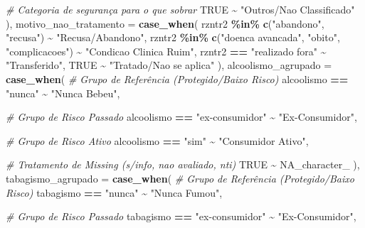 \documentclass[
]{article}
\newenvironment{Shaded}{\begin{snugshade}}{\end{snugshade}}
\newcommand{\AttributeTok}[1]{\textcolor[rgb]{0.13,0.29,0.53}{#1}}
\newcommand{\CommentTok}[1]{\textcolor[rgb]{0.56,0.35,0.01}{\textit{#1}}}
\newcommand{\ConstantTok}[1]{\textcolor[rgb]{0.56,0.35,0.01}{#1}}
\newcommand{\FunctionTok}[1]{\textcolor[rgb]{0.13,0.29,0.53}{\textbf{#1}}}
\newcommand{\NormalTok}[1]{#1}
\newcommand{\SpecialCharTok}[1]{\textcolor[rgb]{0.81,0.36,0.00}{\textbf{#1}}}
\newcommand{\StringTok}[1]{\textcolor[rgb]{0.31,0.60,0.02}{#1}}
\begin{document}
\begin{Shaded}
\begin{Highlighting}[]
      \CommentTok{\# Categoria de segurança para o que sobrar}
      \ConstantTok{TRUE} \SpecialCharTok{\textasciitilde{}} \StringTok{"Outros/Nao Classificado"}
\NormalTok{    ),}
    \AttributeTok{motivo\_nao\_tratamento =} \FunctionTok{case\_when}\NormalTok{(}
\NormalTok{      rzntr2 }\SpecialCharTok{\%in\%} \FunctionTok{c}\NormalTok{(}\StringTok{"abandono"}\NormalTok{, }\StringTok{"recusa"}\NormalTok{) }\SpecialCharTok{\textasciitilde{}} \StringTok{"Recusa/Abandono"}\NormalTok{,}
\NormalTok{      rzntr2 }\SpecialCharTok{\%in\%} \FunctionTok{c}\NormalTok{(}\StringTok{"doenca avancada"}\NormalTok{, }\StringTok{"obito"}\NormalTok{, }\StringTok{"complicacoes"}\NormalTok{) }\SpecialCharTok{\textasciitilde{}} \StringTok{"Condicao Clinica Ruim"}\NormalTok{,}
\NormalTok{      rzntr2 }\SpecialCharTok{==} \StringTok{"realizado fora"} \SpecialCharTok{\textasciitilde{}} \StringTok{"Transferido"}\NormalTok{,}
      \ConstantTok{TRUE} \SpecialCharTok{\textasciitilde{}} \StringTok{"Tratado/Nao se aplica"}
\NormalTok{    ),}
    \AttributeTok{alcoolismo\_agrupado =} \FunctionTok{case\_when}\NormalTok{(}
      \CommentTok{\# Grupo de Referência (Protegido/Baixo Risco)}
\NormalTok{      alcoolismo }\SpecialCharTok{==} \StringTok{"nunca"} \SpecialCharTok{\textasciitilde{}} \StringTok{"Nunca Bebeu"}\NormalTok{,}
      
      \CommentTok{\# Grupo de Risco Passado}
\NormalTok{      alcoolismo }\SpecialCharTok{==} \StringTok{"ex{-}consumidor"} \SpecialCharTok{\textasciitilde{}} \StringTok{"Ex{-}Consumidor"}\NormalTok{,}
      
      \CommentTok{\# Grupo de Risco Ativo}
\NormalTok{      alcoolismo }\SpecialCharTok{==} \StringTok{"sim"} \SpecialCharTok{\textasciitilde{}} \StringTok{"Consumidor Ativo"}\NormalTok{,}
      
      \CommentTok{\# Tratamento de Missing (s/info, nao avaliado, nti)}
      \ConstantTok{TRUE} \SpecialCharTok{\textasciitilde{}} \ConstantTok{NA\_character\_}
\NormalTok{    ),}
    \AttributeTok{tabagismo\_agrupado =} \FunctionTok{case\_when}\NormalTok{(}
      \CommentTok{\# Grupo de Referência (Protegido/Baixo Risco)}
\NormalTok{      tabagismo }\SpecialCharTok{==} \StringTok{"nunca"} \SpecialCharTok{\textasciitilde{}} \StringTok{"Nunca Fumou"}\NormalTok{,}
      
      \CommentTok{\# Grupo de Risco Passado}
\NormalTok{      tabagismo }\SpecialCharTok{==} \StringTok{"ex{-}consumidor"} \SpecialCharTok{\textasciitilde{}} \StringTok{"Ex{-}Consumidor"}\NormalTok{,}
      

\end{Highlighting}
\end{Shaded}
\end{document}
